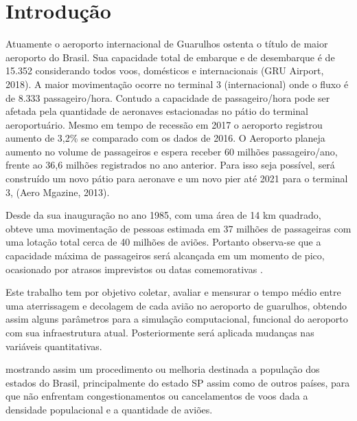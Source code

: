 \documentclass[12pt]{article}
\begin{document}
  
  \section{Introdução}
  
    Atuamente o aeroporto internacional de Guarulhos ostenta o título de maior
    aeroporto do Brasil. Sua capacidade total de embarque e de desembarque é
    de 15.352 considerando todos voos, domésticos e internacionais (GRU Airport, 2018).
    A maior movimentação ocorre no terminal 3 (internacional) onde o fluxo  é de
    8.333 passageiro/hora. Contudo a capacidade de passageiro/hora pode ser 
    afetada pela quantidade de aeronaves estacionadas no pátio do terminal
    aeroportuário. Mesmo em tempo de recessão em 2017 o aeroporto registrou 
    aumento de 3,2\% se comparado com os dados de 2016. O Aeroporto planeja
    aumento no volume de passageiros e espera receber 60 milhões passageiro/ano,
    frente ao 36,6 milhões registrados no ano anterior. Para isso seja possível,
    será construído um novo pátio para aeronave e um novo pier até 2021 para o 
    terminal 3, (Aero Mgazine, 2013).
  
    Desde da sua inauguração no ano 1985, com uma área de 14 km quadrado,
    obteve uma movimentação de pessoas estimada em  37 milhões de passageiras
    com uma lotação total cerca de 40 milhões de aviões. Portanto observa-se
    que a capacidade máxima de passageiros será alcançada em um momento de
    pico, ocasionado por atrasos imprevistos ou datas comemorativas
    \cite{Moser:07}.
    
  
  
  
  Este trabalho tem por objetivo coletar, avaliar e mensurar o tempo médio
  entre uma aterrissagem e  decolagem de cada avião no aeroporto de guarulhos,
  obtendo assim alguns parâmetros para a simulação computacional, funcional 
  do aeroporto com sua infraestrutura atual.
  Posteriormente será  aplicada mudanças nas variáveis quantitativas.
  
  mostrando assim um procedimento ou melhoria destinada  a população dos
  estados do Brasil, principalmente do estado SP assim como de outros países,
  para que não enfrentam congestionamentos ou cancelamentos de voos dada a 
  densidade populacional e a quantidade de aviões.
  
\end{document}
